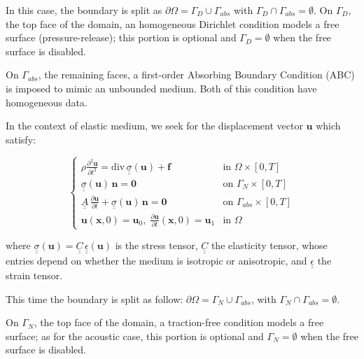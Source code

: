  In this case, the boundary is split as $\partial \Omega =  \Gamma_D \cup \Gamma_{abs}$ with $\Gamma_D \cap \Gamma_{abs} = \emptyset$. 
 On $\Gamma_D$, the top face of the domain, an homogeneous Dirichlet condition models a free surface (pressure-release);
 this portion is optional and $\Gamma_D = \emptyset$ when the free surface is disabled. 
 
 On $\Gamma_{abs}$, the remaining faces, a first-order Absorbing Boundary Condition (ABC) is imposed to mimic an unbounded medium.
 Both of this condition have homogeneous data.
  
In the context of elastic medium, we seek for the displacement vector $\textbf{u}$ which satisfy: 

\begin{equation}
  \left\{
  \begin{array}{ll}
    \rho {\displaystyle \frac{\partial^2 \mathbf{u}}{\partial t^2}} = \mathrm{div} \, \underline{\underline{\sigma}}(\mathbf{u}) + \mathbf{f} & \mbox{in } \Omega \times [0,T] \\[2ex]
    \underline{\underline{\sigma}}(\mathbf{u})\, \mathbf{n} = \mathbf{0} & \mbox{on } \Gamma_N \times [0,T] \\[2ex]
    \underline{\underline{A}}\, {\displaystyle \frac{\partial \mathbf{u}}{\partial t}} + \underline{\underline{\sigma}}(\mathbf{u})\, \mathbf{n} = \mathbf{0} & \mbox{on } \Gamma_{abs} \times [0,T] \\[2ex]
    \mathbf{u}(\mathbf{x},0) = \mathbf{u}_0, \; {\displaystyle \frac{\partial \mathbf{u}}{\partial t}} (\mathbf{x},0) = \mathbf{u}_1 & \mbox{in } \Omega
  \end{array}
  \right.
\end{equation}

where $\underline{\underline{\sigma}}(\mathbf{u}) = \underline{\underline{C}}\,\underline{\underline{\epsilon}}(\mathbf{u}) $ is the stress tensor, $\underline{\underline{C}}$ the elasticity tensor, whose entries depend on whether the medium is isotropic or anisotropic, and 
$\underline{\underline{\epsilon}}$ the strain tensor. 

This time the boundary is split as follow: $\partial\Omega = \Gamma_N \cup \Gamma_{abs}$, with $\Gamma_N \cap \Gamma_{abs} = \emptyset$.

On $\Gamma_N$, the top face of the domain, a traction-free condition models a free surface;  as for the acoustic case, this portion is
optional and $\Gamma_N = \emptyset$ when the free surface is disabled.

